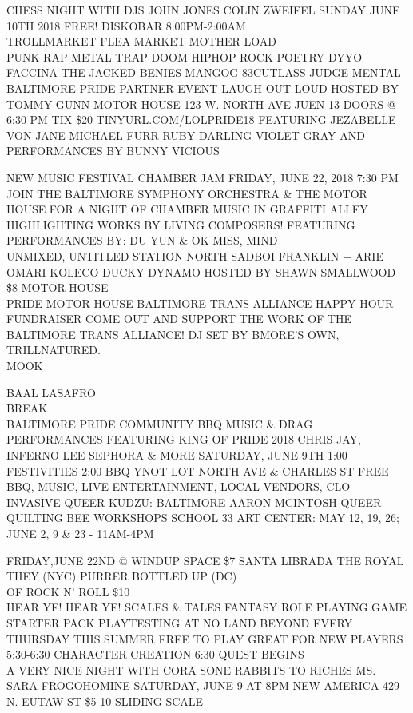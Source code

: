 \documentclass[10pt,letterpaper]{article}
\begin{document}
CHESS NIGHT WITH DJS JOHN JONES COLIN ZWEIFEL SUNDAY JUNE 10TH 2018 FREE!  DISKOBAR 8:00PM{-}2:00AM\\
TROLLMARKET FLEA MARKET MOTHER LOAD\\
PUNK RAP METAL TRAP DOOM HIPHOP ROCK POETRY DYYO FACCINA THE JACKED BENIES MANGOG 83CUTLASS JUDGE MENTAL\\
BALTIMORE PRIDE PARTNER EVENT LAUGH OUT LOUD HOSTED BY TOMMY GUNN MOTOR HOUSE 123 W. NORTH AVE JUEN 13 DOORS @ 6:30 PM TIX \$20 TINYURL.COM/LOLPRIDE18 FEATURING JEZABELLE VON JANE MICHAEL FURR RUBY DARLING VIOLET GRAY AND PERFORMANCES BY BUNNY VICIOUS

NEW MUSIC FESTIVAL CHAMBER JAM FRIDAY, JUNE 22, 2018 7:30 PM JOIN THE BALTIMORE SYMPHONY ORCHESTRA \& THE MOTOR HOUSE FOR A NIGHT OF CHAMBER MUSIC IN GRAFFITI ALLEY HIGHLIGHTING WORKS BY LIVING COMPOSERS!  FEATURING PERFORMANCES BY: DU YUN \& OK MISS, MIND\\
UNMIXED, UNTITLED STATION NORTH SADBOI FRANKLIN + ARIE OMARI KOLECO DUCKY DYNAMO HOSTED BY SHAWN SMALLWOOD \$8 MOTOR HOUSE\\
PRIDE MOTOR HOUSE BALTIMORE TRANS ALLIANCE HAPPY HOUR FUNDRAISER COME OUT AND SUPPORT THE WORK OF THE BALTIMORE TRANS ALLIANCE!  DJ SET BY BMORE'S OWN, TRILLNATURED.\\
MOOK

BAAL LASAFRO\\
BREAK\\
BALTIMORE PRIDE COMMUNITY BBQ MUSIC \& DRAG PERFORMANCES FEATURING KING OF PRIDE 2018 CHRIS JAY, INFERNO LEE SEPHORA \& MORE SATURDAY, JUNE 9TH 1:00 FESTIVITIES 2:00 BBQ YNOT LOT NORTH AVE \& CHARLES ST FREE BBQ, MUSIC, LIVE ENTERTAINMENT, LOCAL VENDORS, CLO\\
INVASIVE QUEER KUDZU: BALTIMORE AARON MCINTOSH QUEER QUILTING BEE WORKSHOPS SCHOOL 33 ART CENTER: MAY 12, 19, 26; JUNE 2, 9 \& 23 {-} 11AM{-}4PM

FRIDAY,JUNE 22ND @ WINDUP SPACE \$7 SANTA LIBRADA THE ROYAL THEY (NYC) PURRER BOTTLED UP (DC)\\
OF ROCK N' ROLL \$10\\
HEAR YE!  HEAR YE!  SCALES \& TALES FANTASY ROLE PLAYING GAME STARTER PACK PLAYTESTING AT NO LAND BEYOND EVERY THURSDAY THIS SUMMER FREE TO PLAY GREAT FOR NEW PLAYERS 5:30{-}6:30 CHARACTER CREATION 6:30 QUEST BEGINS\\
A VERY NICE NIGHT WITH CORA SONE RABBITS TO RICHES MS. SARA FROGOHOMINE SATURDAY, JUNE 9 AT 8PM NEW AMERICA 429 N. EUTAW ST \$5{-}10 SLIDING SCALE
\end{document}
